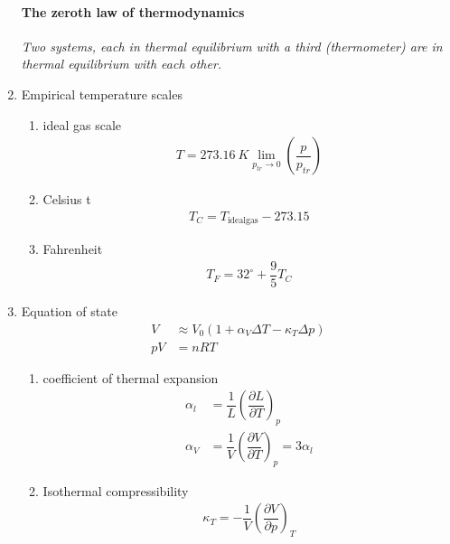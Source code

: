 \documentclass[10.5pt, a4paper, oneside]{article}
\def\D{\partial}
\numberwithin{equation}{section}%
\begin{document}
\begin{multicols}{2}
\begin{enumerate}
		\paragraph{The zeroth law of thermodynamics}
		\textit{Two systems, each in thermal equilibrium with a third (thermometer) are in thermal equilibrium with each other.}
		\item Empirical temperature scales
		\begin{enumerate}
			\item ideal gas scale
				\begin{align}
					T = \SI{273.16}{K}\lim\limits_{p_{tr}\rightarrow 0}\left(\dfrac{p}{p_{tr}}\right)
				\end{align}
			\item Celsius t
				\begin{align}
					T_C = T_{\text{idealgas}} - 273.15
				\end{align}
			\item Fahrenheit
				\begin{align}
					T_F = 32^{\circ} + \dfrac{9}{5}T_C
				\end{align}
		\end{enumerate}
		\item Equation of state
			\begin{align}
				V &\approx V_0(1 + \alpha_V\Delta T - \kappa_T\Delta p)
				\\
				pV &= nRT
			\end{align}
			\begin{enumerate}
				\item coefficient of thermal expansion
				\begin{align}
					\alpha_l &= \dfrac{1}{L}\left(\dfrac{\D L}{\D T}\right)_p
					\\
					\alpha_V &= \dfrac{1}{V}\left(\dfrac{\D V}{\D T}\right)_p = 3\alpha_l
				\end{align}
				\item Isothermal compressibility
				\begin{align}
					\kappa_T = -\dfrac{1}{V}\left(\dfrac{\D V}{\D p}\right)_T
				\end{align}
			\end{enumerate}
	\end{enumerate}
\end{multicols}
\end{document}

